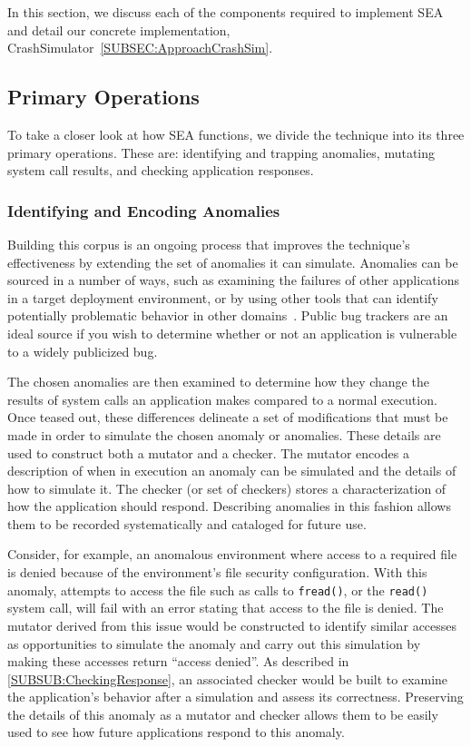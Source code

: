 In this section, we discuss each of the components
required to implement SEA
and detail our concrete implementation,
CrashSimulator~\ref{SUBSEC:ApproachCrashSim}.

\subsection{Primary Operations}
\label{SEC:PrimaryOperations}

To take a closer look at how SEA functions,
we divide the technique
into its three primary operations.
These are:
identifying and trapping anomalies,
mutating system call results,
and checking application responses.

\subsubsection{Identifying and Encoding Anomalies}
\label{SUBSUB:IdentifyingAndEncoding}
Building this corpus is an ongoing process that improves the technique's
effectiveness by extending the set of anomalies it can simulate.
Anomalies can be sourced
in a number of ways,
such as
examining the failures of other applications
in a target deployment environment,
or by using other tools that can identify
potentially problematic behavior in other domains~\cite{Zhuang_NSDI_2014,
rasley2015detecting}.
Public bug trackers are an ideal source
if you wish to determine
whether or not an application
is vulnerable to a widely publicized bug.

The chosen anomalies are then examined
to determine how they change the results
of system calls an application makes
compared to a normal execution.
Once teased out,
these differences delineate
a set of modifications
that must be made
in order to simulate the chosen anomaly or anomalies.
These details are used to
construct both a mutator and a checker.
The mutator encodes
a description of when in execution an anomaly can be simulated
and the details of how to simulate it.
The checker
(or set of checkers)
stores a characterization of
how the application should respond.
Describing anomalies in this fashion
allows them to be recorded systematically and cataloged for future use.

Consider,
for example,
an anomalous environment
where access to a required file is denied because of
the environment's file security configuration.
With this anomaly,
attempts to access the file
such as calls to {\tt fread()},
or the {\tt read()} system call,
will fail with an error stating that access to the file is denied.
The mutator derived from this issue would be constructed to
identify similar accesses as opportunities
to simulate the anomaly
and carry out this simulation
by making these
accesses return ``access denied''.
As described in \ref{SUBSUB:CheckingResponse},
an associated checker would be built to
examine the application's behavior after a simulation and assess its
correctness.
Preserving the details of this anomaly
as a mutator and checker
allows them to be
easily used
to see how future applications
respond to this anomaly.

